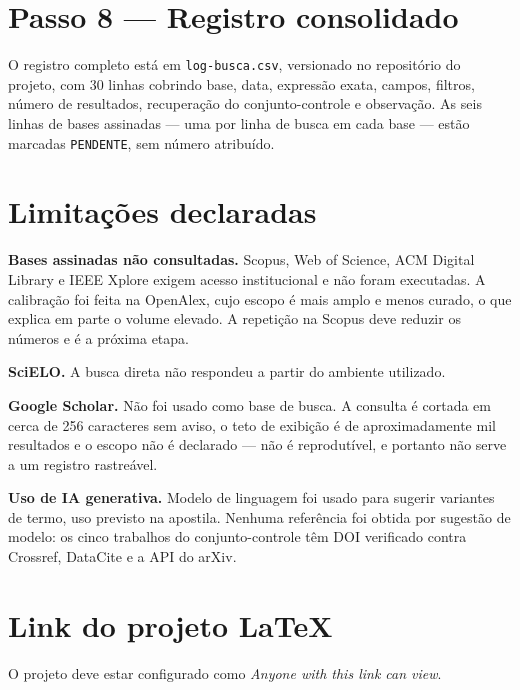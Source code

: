 \documentclass[12pt,a4paper]{article}
\begin{document}
\section{Passo 8 --- Registro consolidado}

O registro completo está em \texttt{log-busca.csv}, versionado no repositório do projeto,
com 30 linhas cobrindo base, data, expressão exata, campos, filtros, número de resultados,
recuperação do conjunto-controle e observação. As seis linhas de bases assinadas --- uma
por linha de busca em cada base --- estão marcadas \texttt{PENDENTE}, sem número atribuído.

\section{Limitações declaradas}

\textbf{Bases assinadas não consultadas.} Scopus, Web of Science, ACM Digital Library e
IEEE Xplore exigem acesso institucional e não foram executadas. A calibração foi feita na
OpenAlex, cujo escopo é mais amplo e menos curado, o que explica em parte o volume elevado.
A repetição na Scopus deve reduzir os números e é a próxima etapa.

\textbf{SciELO.} A busca direta não respondeu a partir do ambiente utilizado.

\textbf{Google Scholar.} Não foi usado como base de busca. A consulta é cortada em cerca de
256 caracteres sem aviso, o teto de exibição é de aproximadamente mil resultados e o escopo
não é declarado --- não é reprodutível, e portanto não serve a um registro rastreável.

\textbf{Uso de IA generativa.} Modelo de linguagem foi usado para sugerir variantes de
termo, uso previsto na apostila. Nenhuma referência foi obtida por sugestão de modelo: os
cinco trabalhos do conjunto-controle têm DOI verificado contra Crossref, DataCite e a API
do arXiv.

\section{Link do projeto \texorpdfstring{\LaTeX}{LaTeX}}

\begin{tcolorbox}[colback=red!5,colframe=red!60!black,title=\textbf{PREENCHER ANTES DE ENTREGAR}]
\centering\large{}
\end{tcolorbox}

\noindent O projeto deve estar configurado como \textit{Anyone with this link can view}.
\end{document}
